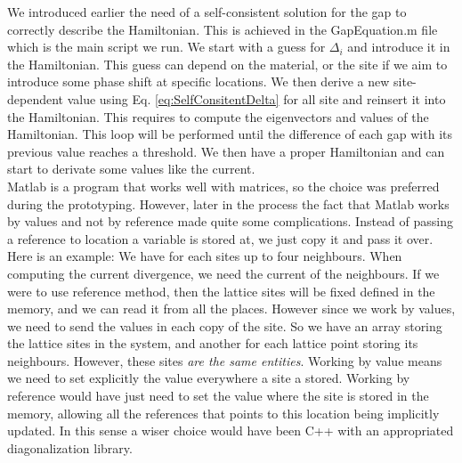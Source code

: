 \documentclass[../main.tex]{subfile}
\begin{document}
We introduced earlier the need of a self-consistent solution for the gap to correctly describe the Hamiltonian.
This is achieved in the GapEquation.m file which is the main script we run. We start with a guess for
$\Delta_i$ and introduce it in the Hamiltonian. This guess can depend on the material, or the site 
if we aim to introduce some phase shift at specific locations.
We then derive a new site-dependent value using Eq. \ref{eq:SelfConsitentDelta} for all site and
reinsert it into the Hamiltonian. This requires to compute the eigenvectors and values of the Hamiltonian. This loop will be 
performed until the difference of each gap with its previous value reaches a threshold. We then have a proper 
Hamiltonian and can start to derivate some values like the current. \\

Matlab is a program that works well with matrices, so the choice was preferred during the prototyping. However, later in the process the fact that Matlab works 
by values and not by reference made quite some complications. Instead of passing a reference to location a variable is stored at,
we just copy it and pass it over. Here is an example: We have for each sites up to four neighbours. When computing the current divergence, 
we need the current of the neighbours. If we were to use reference method, then the lattice sites will be fixed defined in the memory,
and we can read it from all the places. However since we work by values, we need to send the values in each copy of the site.
So we have an array storing the lattice sites in the system, and another for each lattice point storing its neighbours.
However, these sites \textit{are the same entities}. Working by value means we need to set explicitly the value everywhere a site a stored.
Working by reference would have just need to set the value where the site is stored in the memory,
allowing all the references that points to this location being implicitly updated. In this sense a wiser choice would have been C++
with an appropriated diagonalization library. \\
\end{document}
